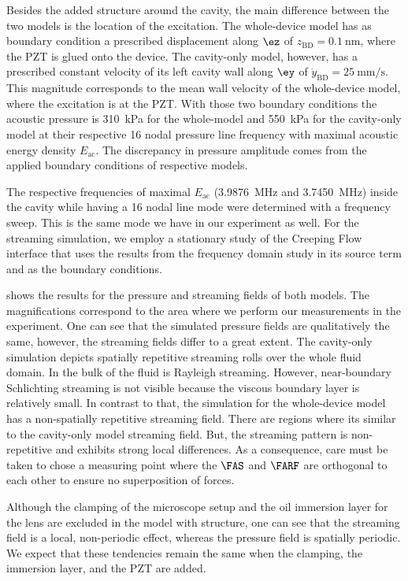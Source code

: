 Besides the added structure around the cavity, the main difference between the 
two models is the location of the excitation. The whole-device model has as 
boundary condition a prescribed displacement along $\ez$ of 
$z_{\text{BD}}=\SI{0.1}{\nm}$, where the PZT is glued onto the device. The 
cavity-only model, however, has a prescribed constant velocity of its left 
cavity wall along $\ey$ of $\dot{y}_{\text{BD}} = \SI{25}{\mm\per\second}$. 
This magnitude corresponds to the mean wall velocity of the whole-device model, 
where the excitation is at the PZT. With those two boundary conditions the 
acoustic pressure is \SI{310}{\kPa} for the whole-model and \SI{550}{\kPa} for 
the cavity-only model at their respective 16 nodal pressure line frequency with 
maximal acoustic energy density $E_{\text{ac}}$. The discrepancy in pressure 
amplitude comes from the applied boundary conditions of respective models.

The respective frequencies of maximal $E_{\text{ac}}$ 
(\SI{3.9876}{\MHz} and \SI{3.7450}{\MHz}) inside the cavity while having a 16 
nodal line mode were determined with a frequency sweep. This is the same mode 
we have in our experiment as well. For the streaming simulation, we employ a 
stationary study of the Creeping Flow interface that uses the results from the 
frequency domain study in its source term and as the boundary conditions.

 shows the results for the pressure and streaming 
fields of both models. The magnifications correspond to the area where we 
perform our measurements in the experiment. One can see that the simulated 
pressure fields are qualitatively the same, however, the streaming fields 
differ to a great extent. The cavity-only simulation depicts spatially 
repetitive streaming rolls over the whole fluid domain. In the bulk of the 
fluid is Rayleigh streaming. However, near-boundary Schlichting streaming is 
not visible because the viscous boundary layer is relatively small. In contrast 
to that, the simulation for the whole-device model has a non-spatially 
repetitive streaming field. There are regions where its similar to the 
cavity-only model streaming field. But, the streaming pattern is non-repetitive 
and exhibits strong local differences. As a consequence, care must be taken to 
chose a measuring point where the $\FAS$ and $\FARF$ are orthogonal to each 
other to ensure no superposition of forces.

Although the clamping of the microscope setup and the oil immersion layer for 
the lens are excluded in the model with structure, one can see that the 
streaming field is a local, non-periodic effect, whereas the pressure field is 
spatially periodic. We expect that these tendencies remain the same when the 
clamping, the immersion layer, and the PZT are added.
